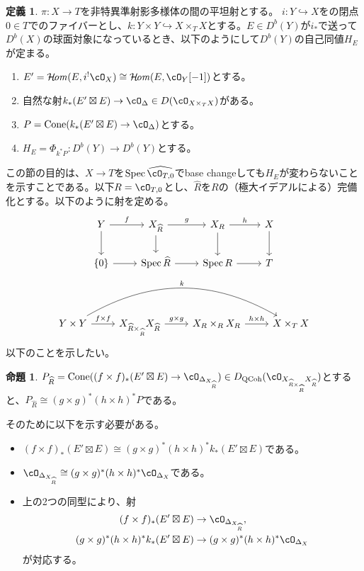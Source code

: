 \documentclass[uplatex, a4paper, dvipdfmx]{jsarticle}
\theoremstyle{definition}
\newtheorem{definition}[theorem]{定義}
\newtheorem{proposition}[theorem]{命題}
\DeclareMathOperator{\CHom}{\mathcal{H}\!\mathit{om}}
\DeclareMathOperator{\Cone}{\mathrm{Cone}}
\DeclareMathOperator{\Spec}{\mathrm{Spec}}
\DeclareMathOperator{\QCoh}{\mathrm{QCoh}}
\begin{document}
\begin{definition}
    $\pi \colon X \to T$を非特異準射影多様体の間の平坦射とする。
    $i \colon Y \hookrightarrow X$をの閉点$0 \in T$でのファイバーとし、$k \colon Y \times Y \hookrightarrow X \times_T X$とする。$E \in D^b(Y)$が$i_*$で送って$D^b(X)$の球面対象になっているとき、以下のようにして$D^b(Y)$の自己同値$H_E$が定まる。
    \begin{enumerate}
        \item $E' = \CHom(E, i^!\cO_X) \cong \CHom(E, \cO_Y[-1])$とする。
        \item 自然な射$k_*(E' \boxtimes E) \to \cO_{\Delta} \in D(\cO_{X \times_T X})$がある。
        \item $P = \Cone(k_*(E' \boxtimes E) \to \cO_{\Delta})$とする。
        \item $H_E = \Phi_{k^*P} \colon D^b(Y) \to D^b(Y)$とする。
    \end{enumerate}
\end{definition}
この節の目的は、$X \to T$を$\Spec \widehat{\cO_{T, 0}}$でbase changeしても$H_E$が変わらないことを示すことである。以下$R = \cO_{T, 0}$とし、$\widehat{R}$を$R$の（極大イデアルによる）完備化とする。以下のように射を定める。
\[
    \begin{tikzcd}
        Y \ar[r, "f"] \ar[d]&X_{\widehat{R}} \ar[r, "g"] \ar[d]& X_R \ar[r, "h"] \ar[d]& X \ar[d]\\
        \{0\} \ar[r]& \Spec \widehat{R} \ar[r] & \Spec R \ar[r] & T
    \end{tikzcd}
\]
\[
    \begin{tikzcd}
        Y \times Y \ar[r, "f \times f"] \ar[rrr, "k", bend left]& X_{\widehat{R} \times_{\widehat{R}}} X_{\widehat{R}} \ar[r, "g \times g"] & X_R \times_R X_R \ar[r, "h \times h"] & X \times_T X
    \end{tikzcd}
\]
以下のことを示したい。
\begin{proposition}
    $P_{\widehat{R}} = \Cone((f \times f)_*(E' \boxtimes E) \to \cO_{\Delta_{X_{\widehat{R}}}}) \in D_{\QCoh}(\cO_{X_{\widehat{R} \times_{\widehat{R}}} X_{\widehat{R}}})$とすると、$P_{\widehat{R}} \cong (g \times g)^*(h \times h)^*P$である。
\end{proposition}
そのために以下を示す必要がある。
\begin{itemize}
    \item $(f \times f)_*(E' \boxtimes E) \cong (g \times g)^*(h \times h)^*k_*(E' \boxtimes E)$である。
    \item $\cO_{\Delta_{X_{\widehat{R}}}} \cong (g \times g)^*(h \times h)^*\cO_{\Delta_X}$である。
    \item 上の2つの同型により、射
          \begin{align}(f \times f)_*(E' \boxtimes E)                  & \to \cO_{\Delta_{X_{\widehat{R}}}},            \\
             (g \times g)^*(h \times h)^*k_*(E' \boxtimes E) & \to (g \times g)^*(h \times h)^*\cO_{\Delta_X}\end{align}
          が対応する。
\end{itemize}
\end{document}
